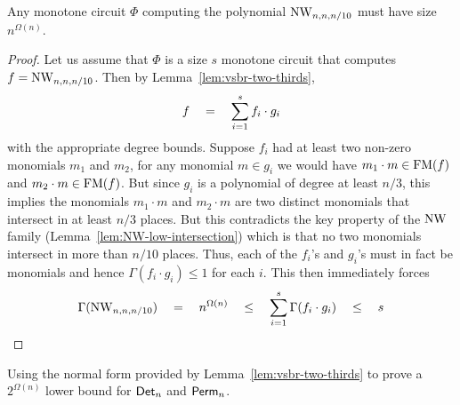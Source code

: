 \begin{theorem}
Any monotone circuit $\Phi$ computing the polynomial $\mathrm{NW}_{n,n,n/10}$  must have size $n^{\Omega(n)}$. 
\end{theorem}
\begin{proof}
  Let us assume that $\Phi$ is a size $s$ monotone circuit that computes $f = \mathrm{NW}_{n,n,n/10}$. Then by Lemma~\ref{lem:vsbr-two-thirds},
  \[
  f \quad = \quad \sum_{i=1}^s f_i \cdot g_i
  \]
  with the appropriate degree bounds. Suppose $f_i$ had at least two non-zero monomials $m_1$ and $m_2$, for any monomial $m \in g_i$ we would have $m_1 \cdot m \in \mathrm{FM}(f)$ and $m_2 \cdot m \in \mathrm{FM}(f)$. But since $g_i$ is a polynomial of degree at least $n/3$, this implies the monomials $m_1\cdot m$ and $m_2 \cdot m$ are two distinct monomials that intersect in at least $n/3$ places. But this contradicts the key property of the $\mathrm{NW}$ family (Lemma~\ref{lem:NW-low-intersection}) which is that no two monomials intersect in more than $n/10$ places. Thus, each of the $f_i$'s and $g_i$'s must in fact be monomials and hence $\Gamma(f_i\cdot g_i) \leq 1$ for each $i$. This then immediately forces 
\[
\Gamma(\mathrm{NW}_{n,n,n/10}) \quad = \quad n^{\Omega(n)} \quad \leq \quad \sum_{i=1}^s \Gamma(f_i \cdot g_i) \quad \leq \quad s
\]
\end{proof}

\begin{exercise}
Using the normal form provided by Lemma~\ref{lem:vsbr-two-thirds} to prove a $2^{\Omega(n)}$ lower bound for $\mathsf{Det}_n$ and $\mathsf{Perm}_n$. 
\end{exercise}



